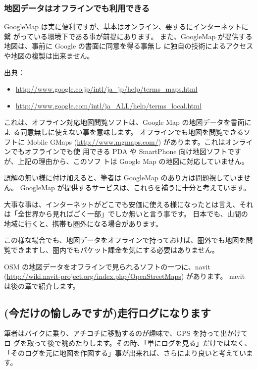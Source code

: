 \documentclass[mingoth,a4paper]{jsarticle}
\begin{document}
\subsubsection{地図データはオフラインでも利用できる}

GoogleMap は実に便利ですが、基本はオンライン、要するにインターネットに繋
がっている環境下である事が前提にあります。
また、GoogleMap が提供する地図は、事前に Google の書面に同意を得る事無し
に独自の技術によるアクセスや地図の複製は出来ません。

出典：
\begin{itemize}
 \item \url{http://www.google.co.jp/intl/ja_jp/help/terms_maps.html}
 \item \url{http://www.google.com/intl/ja_ALL/help/terms_local.html}
\end{itemize}

これは、オフライン対応地図閲覧ソフトは、Google Map の地図データを書面によ
る同意無しに使えない事を意味します。
オフラインでも地図を閲覧できるソフトに Mobile GMaps
(\url{http://www.mgmaps.com/}) があります。これはオンラインでもオフラインでも使
用できる PDA や SmartPhone 向け地図ソフトですが、上記の理由から、このソフ
トは Google Map の地図に対応していません。

誤解の無い様に付け加えると、筆者は GoogleMap のあり方は問題視していません。
GoogleMap が提供するサービスは、これらを補うに十分と考えています。

大事な事は、インターネットがどこでも安価に使える様になったとは言え、それ
は「全世界から見ればごく一部」でしか無いと言う事です。
日本でも、山間の地域に行くと、携帯も圏外になる場合があります。

この様な場合でも、地図データをオフラインで持っておけば、圏外でも地図を閲
覧できますし、圏内でもパケット課金を気にする必要はありません。

OSM の地図データをオフラインで見られるソフトの一つに、navit
(\url{http://wiki.navit-project.org/index.php/OpenStreetMaps}) があります。
navit は後の章で紹介します。

\subsection{(今だけの愉しみですが)走行ログになります}

筆者はバイクに乗り、アチコチに移動するのが趣味で、GPS を持って出かけてロ
グを取って後で眺めたりします。その時、「単にログを見る」だけではなく、
「そのログを元に地図を作図する」事が出来れば、さらにより良いと考えていま
す。
\end{document}
